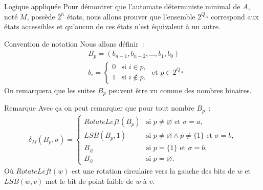 \begin{frame}{\myframetitle}
  \begin{block}{Logique appliquée}
    Pour démontrer que l'automate déterministe minimal de \(A\), noté \(M\),
    possède \(2^n\) états, nous allons prouver que l'ensemble \(2^{Q_A}\)
    correspond aux états accessibles et qu'aucun de ces états n'est équivalent à
    un autre.
  \end{block}
\end{frame}

\begin{frame}{\myframetitle}
  \begin{block}{Convention de notation}
    Nous allons définir~:
    \begin{align*}
      &B_p = (b_{n - 1}, b_{n - 2}, \ldots, b_{1}, b_{0}) \\
      &b_i =
      \begin{cases}
        0 & \text{si } i \in p, \\
        1 & \text{si } i \notin p.
      \end{cases}
      \text{ et } p \in 2^{Q_A}
    \end{align*}
    On remarquera que les suites \(B_p\) peuvent être vu comme des nombres
    binaires.
  \end{block}
\end{frame}

\begin{frame}{\myframetitle}
  \begin{block}{Remarque}
    Avec ça on peut remarquer que pour tout nombre \(B_p\)~:
    \begin{gather*}
      \delta_M(B_p, \sigma) =
      \begin{cases}
        RotateLeft(B_p) &\text{si } p \neq \varnothing \text{ et }
        \sigma = a, \\
        LSB(B_p, 1) &\text{si } p \neq \varnothing \land p \neq \{1\}
        \text{ et } \sigma = b, \\
        B_{\varnothing} &\text{si } p = \{1\} \text{ et } \sigma = b, \\
        B_{\varnothing} &\text{si } p = \varnothing.
      \end{cases}
    \end{gather*}
    Où \(RotateLeft(w)\) est une rotation circulaire vers la gauche des bits de
    \(w\) et \(LSB(w, v)\) met le bit de point faible de \(w\) à \(v\).
  \end{block}
\end{frame}

